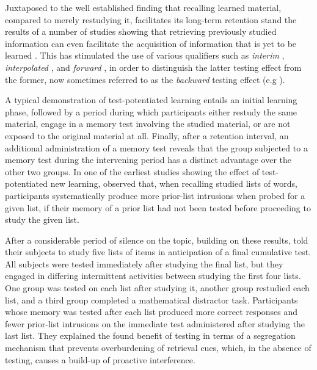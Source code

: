 \documentclass[../main.tex]{subfiles}
\begin{document}
Juxtaposed to the well established finding that recalling learned material, compared to merely restudying it, facilitates its long-term retention \citep{roedigeriiiPowerTestingMemory2006, roedigeriiiTestEnhancedLearningTaking2006, rowlandEffectTestingRestudy2014, adesopeRethinkingUseTests2017, roedigeriiiCriticalRoleRetrieval2011, gloverTestingPhenomenonNot1989} stand the results of a number of studies showing that retrieving previously studied information can even facilitate the acquisition of information that is yet to be learned \citep{chanRetrievalPotentiatesNew2018a, yangEnhancingLearningRetrieval2018}. This has stimulated the use of various qualifiers such as \textit{interim} \citep{wissmanInterimTestEffect2011}, \textit{interpolated} \citep{szpunarInterpolatedMemoryTests2013}, and \textit{forward} \citep{pastotterRetrievalPracticeEnhances2014,yangEnhancingLearningRetrieval2018}, in order to distinguish the latter testing effect from the former, now sometimes referred to as the \textit{backward} testing effect (e.g \citealp{yangEnhancingLearningRetrieval2018}). 

A typical demonstration of test-potentiated learning entails an initial learning phase, followed by a period during which participants either restudy the same material, engage in a memory test involving the studied material, or are not exposed to the original material at all. Finally, after a retention interval, an additional administration of a memory test reveals that the group subjected to a memory test during the intervening period has a distinct advantage over the other two groups. In one of the earliest studies showing the effect of test-potentiated new learning, \cite{darleyEffectsPriorFree1971} observed that, when recalling studied lists of words, participants systematically produce more prior-list intrusions when probed for a given list, if their memory of a prior list had not been tested before proceeding to study the given list. 

After a considerable period of silence on the topic, building on these results, \cite{szpunarTestingStudyInsulates2008} told their subjects to study five lists of items in anticipation of a final cumulative test. All subjects were tested immediately after studying the final list, but they engaged in differing intermittent activities between studying the first four lists. One group was tested on each list after studying it, another group restudied each list, and a third group completed a mathematical distractor task. Participants whose memory was tested after each list produced more correct responses and fewer prior-list intrusions on the immediate test administered after studying the last list. They explained the found benefit of testing in terms of a segregation mechanism that prevents overburdening of retrieval cues, which, in the absence of testing, causes a build-up of proactive interference.
\end{document}
